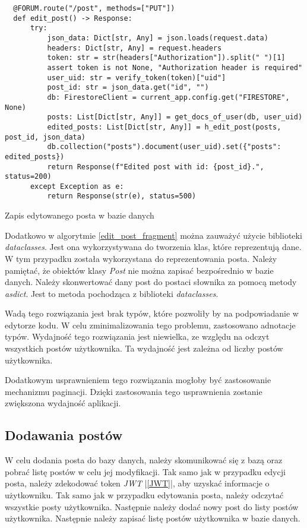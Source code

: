 \begin{code}[H]
  \begin{verbatim}
  @FORUM.route("/post", methods=["PUT"])
  def edit_post() -> Response:
      try:
          json_data: Dict[str, Any] = json.loads(request.data)
          headers: Dict[str, Any] = request.headers
          token: str = str(headers["Authorization"]).split(" ")[1]
          assert token is not None, "Authorization header is required"
          user_uid: str = verify_token(token)["uid"]
          post_id: str = json_data.get("id", "")
          db: FirestoreClient = current_app.config.get("FIRESTORE", None)
          posts: List[Dict[str, Any]] = get_docs_of_user(db, user_uid)
          edited_posts: List[Dict[str, Any]] = h_edit_post(posts, post_id, json_data)
          db.collection("posts").document(user_uid).set({"posts": edited_posts})
          return Response(f"Edited post with id: {post_id}.", status=200)
      except Exception as e:
          return Response(str(e), status=500)
  \end{verbatim}
  \caption{Zapis edytowanego posta w bazie danych}
  \label{edit_post_fragment}
\end{code}

Dodatkowo w algorytmie \ref{edit_post_fragment} można zauważyć użycie biblioteki \textit{dataclasses}. Jest ona wykorzystywana do tworzenia klas, które reprezentują dane. W tym przypadku została wykorzystana do reprezentowania posta. Należy pamiętać, że obiektów klasy \textit{Post} nie można zapisać bezpośrednio w bazie danych. Należy skonwertować dany post do postaci słownika za pomocą metody \textit{asdict}. Jest to metoda pochodząca z biblioteki \textit{dataclasses}.

Wadą tego rozwiązania jest brak typów, które pozwoliły by na podpowiadanie w edytorze kodu. W celu zminimalizowania tego problemu, zastosowano adnotacje typów. Wydajność tego rozwiązania jest niewielka, ze względu na odczyt wszystkich postów użytkownika. Ta wydajność jest zależna od liczby postów użytkownika. 

Dodatkowym usprawnieniem tego rozwiązania mogłoby być zastosowanie mechanizmu paginacji. Dzięki zastosowania tego usprawnienia zostanie zwiększona wydajność aplikacji. 

\subsection{Dodawania postów}
W celu dodania posta do bazy danych, należy skomunikować się z bazą oraz pobrać listę postów w celu jej modyfikacji. Tak samo jak w przypadku edycji posta, należy zdekodować token \textit{JWT} |\ref{JWT}|, aby uzyskać informacje o użytkowniku. Tak samo jak w przypadku edytowania posta, należy odczytać wszystkie posty użytkownika. Następnie należy dodać nowy post do listy postów użytkownika. Następnie należy zapisać listę postów użytkownika w bazie danych.

